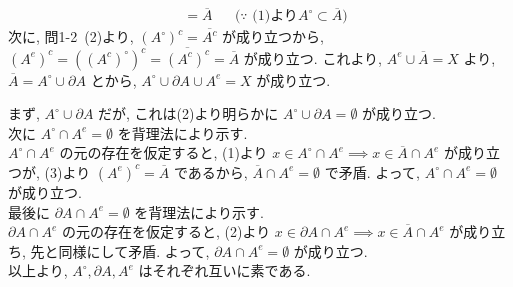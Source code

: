 \documentclass[dvipdfmx,a4j]{jarticle}
\begin{document}
{\begin{align*}
                            &= \overline{A}&&\text{($\because$ (1)より$A^\circ \subset \overline{A}$)} 
\end{align*}
次に, 問1-2\ (2)より, $(A^\circ)^c = \overline{A^c}$ が成り立つから, $(A^e)^c = ((A^c)^\circ)^c = \overline{(A^c)^c} = \overline{A}$ が成り立つ. これより, $A^e \cup \overline{A} = X$ より, 
$\overline{A} = A^\circ \cup \partial A$ とから, $A^\circ \cup \partial A \cup A^e = X$ が成り立つ.
\item
まず, $A^\circ \cup \partial A$ だが, これは(2)より明らかに $A^\circ \cup \partial A = \emptyset$ が成り立つ.\\
次に $A^\circ \cap A^e = \emptyset$ を背理法により示す.\\
$A^\circ \cap A^e$ の元の存在を仮定すると, (1)より $x \in A^\circ \cap A^e \implies x \in \overline{A} \cap A^e$ が成り立つが, (3)より $(A^e)^c = \overline{A}$ であるから, $\overline{A} \cap A^e = \emptyset$
で矛盾. よって, $A^\circ \cap A^e = \emptyset$ が成り立つ.\\
最後に $\partial A \cap A^e = \emptyset$ を背理法により示す.\\
$\partial A \cap A^e$ の元の存在を仮定すると, (2)より $x \in \partial A \cap A^e \implies x \in \overline{A} \cap A^e$ が成り立ち, 先と同様にして矛盾. よって, $\partial A \cap A^e = \emptyset$ が成り立つ.\\
以上より, $A^\circ, \partial A, A^e$ はそれぞれ互いに素である.
}
\end{document}
